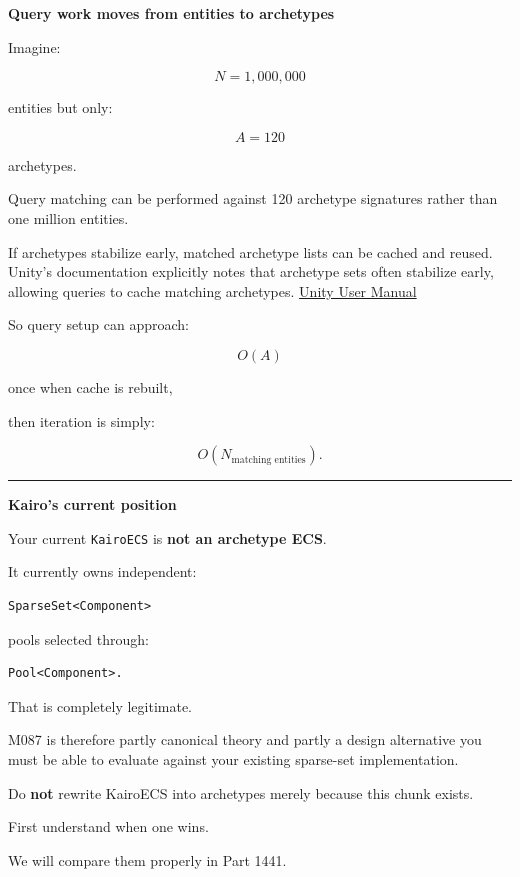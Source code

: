 \textbf{Query work moves from entities to archetypes}

Imagine:

\[
N=1,000,000
\]

entities but only:

\[
A=120
\]

archetypes.

Query matching can be performed against 120 archetype signatures rather than one million entities.

If archetypes stabilize early, matched archetype lists can be cached and reused. Unity's documentation explicitly notes that archetype sets often stabilize early, allowing queries to cache matching archetypes. \href{https://docs.unity.cn/Packages/com.unity.entities\%401.0/manual/concepts-archetypes.html?utm_source=chatgpt.com}{Unity User Manual}

So query setup can approach:

\[
O(A)
\]

once when cache is rebuilt,

then iteration is simply:

\[
O(N_{\text{matching entities}}).
\]

\begin{center}\rule{0.5\linewidth}{0.5pt}\end{center}

\textbf{Kairo's current position}

Your current \texttt{KairoECS} is \textbf{not an archetype ECS}.

It currently owns independent:

\begin{verbatim}
SparseSet<Component>
\end{verbatim}

pools selected through:

\begin{verbatim}
Pool<Component>.
\end{verbatim}

That is completely legitimate.

M087 is therefore partly canonical theory and partly a design alternative you must be able to evaluate against your existing sparse-set implementation.

Do \textbf{not} rewrite KairoECS into archetypes merely because this chunk exists.

First understand when one wins.

We will compare them properly in Part 1441.


